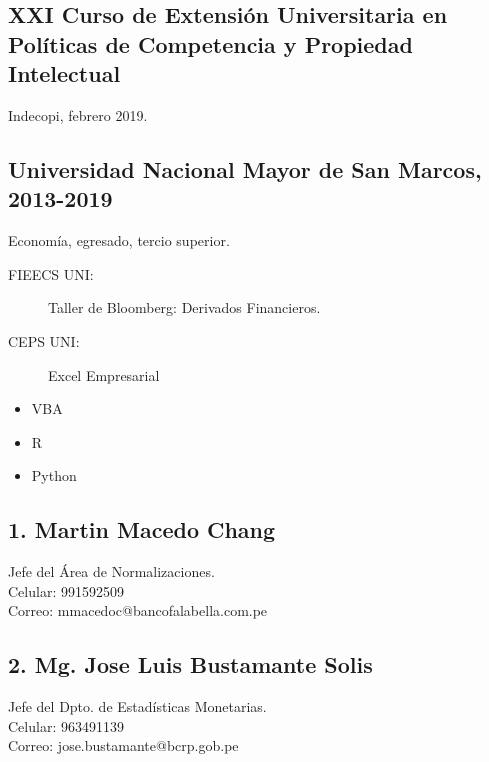 \subsection*{XXI Curso de Extensión Universitaria en Políticas de Competencia y Propiedad Intelectual}
Indecopi, febrero 2019.

\subsection*{Universidad Nacional Mayor de San Marcos, 2013-2019}

Economía, egresado, tercio superior.


\begin{multicols}{2}
\begin{description}
    \item [FIEECS UNI:] Taller de Bloomberg: Derivados Financieros.
    \item [CEPS UNI:] Excel Empresarial
    
\end{description}

\begin{itemize}
    \item VBA
    \item R
    \item Python
\end{itemize}
\end{multicols}

\begin{multicols}{2}
\subsection*{1. Martin Macedo Chang}
Jefe del Área de Normalizaciones. \\
Celular: 991592509 \\
Correo: mmacedoc@bancofalabella.com.pe

\subsection*{2. Mg. Jose Luis Bustamante Solis}
Jefe del Dpto. de Estadísticas Monetarias. \\
Celular: 963491139 \\
Correo: jose.bustamante@bcrp.gob.pe 
\end{multicols}
